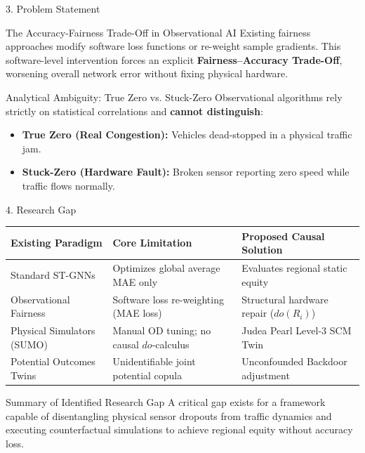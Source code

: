 \documentclass[aspectratio=169, 10pt]{beamer}
\begin{document}
\begin{frame}{3. Problem Statement}
  \begin{block}{The Accuracy-Fairness Trade-Off in Observational AI}
    Existing fairness approaches modify software loss functions or re-weight sample gradients. This software-level intervention forces an explicit \textbf{Fairness--Accuracy Trade-Off}, worsening overall network error without fixing physical hardware.
  \end{block}
  
  \vspace{0.2cm}
  
  \begin{alertblock}{Analytical Ambiguity: True Zero vs. Stuck-Zero}
    Observational algorithms rely strictly on statistical correlations and \textbf{cannot distinguish}:
    \begin{itemize}
      \item \textbf{True Zero (Real Congestion):} Vehicles dead-stopped in a physical traffic jam.
      \item \textbf{Stuck-Zero (Hardware Fault):} Broken sensor reporting zero speed while traffic flows normally.
    \end{itemize}
  \end{alertblock}
\end{frame}

\begin{frame}{4. Research Gap}
  \begin{table}
    \small
    \begin{tabular}{lll}
      \toprule
      \textbf{Existing Paradigm} & \textbf{Core Limitation} & \textbf{Proposed Causal Solution} \\
      \midrule
      Standard ST-GNNs & Optimizes global average MAE only & Evaluates regional static equity \\
      Observational Fairness & Software loss re-weighting (MAE loss) & Structural hardware repair ($do(R_i)$) \\
      Physical Simulators (SUMO) & Manual OD tuning; no causal $do$-calculus & Judea Pearl Level-3 SCM Twin \\
      Potential Outcomes Twins & Unidentifiable joint potential copula & Unconfounded Backdoor adjustment \\
      \bottomrule
    \end{tabular}
  \end{table}
  
  \begin{exampleblock}{Summary of Identified Research Gap}
    A critical gap exists for a framework capable of disentangling physical sensor dropouts from traffic dynamics and executing counterfactual simulations to achieve regional equity without accuracy loss.
  \end{exampleblock}
\end{frame}
\end{document}
